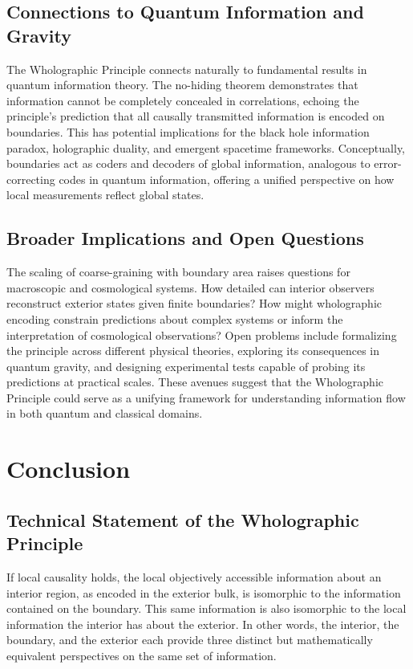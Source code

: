 ﻿\documentclass[12pt]{article}
\begin{document}
\subsection{Connections to Quantum Information and Gravity}
The Wholographic Principle connects naturally to fundamental results in quantum information theory. The no-hiding theorem demonstrates that information cannot be completely concealed in correlations, echoing the principle's prediction that all causally transmitted information is encoded on boundaries. This has potential implications for the black hole information paradox, holographic duality, and emergent spacetime frameworks. Conceptually, boundaries act as coders and decoders of global information, analogous to error-correcting codes in quantum information, offering a unified perspective on how local measurements reflect global states.


\subsection{Broader Implications and Open Questions}
The scaling of coarse-graining with boundary area raises questions for macroscopic and cosmological systems. How detailed can interior observers reconstruct exterior states given finite boundaries? How might wholographic encoding constrain predictions about complex systems or inform the interpretation of cosmological observations? Open problems include formalizing the principle across different physical theories, exploring its consequences in quantum gravity, and designing experimental tests capable of probing its predictions at practical scales. These avenues suggest that the Wholographic Principle could serve as a unifying framework for understanding information flow in both quantum and classical domains.




\section{Conclusion}


\subsection*{Technical Statement of the Wholographic Principle}
If local causality holds, the local objectively accessible information about an interior region, as encoded in the exterior bulk, is isomorphic to the information contained on the boundary. This same information is also isomorphic to the local information the interior has about the exterior. In other words, the interior, the boundary, and the exterior each provide three distinct but mathematically equivalent perspectives on the same set of information.
\end{document}

